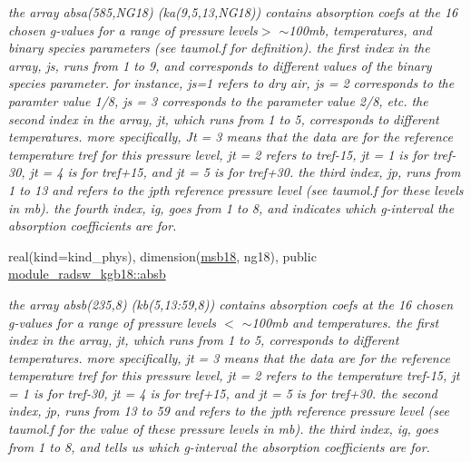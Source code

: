 \begin{DoxyCompactItemize}
\begin{DoxyCompactList}\small\item\em the array absa(585,\+N\+G18) (ka(9,5,13,\+N\+G18)) contains absorption coefs at the 16 chosen g-\/values for a range of pressure levels$>$ $\sim$100mb, temperatures, and binary species parameters (see taumol.\+f for definition). the first index in the array, js, runs from 1 to 9, and corresponds to different values of the binary species parameter. for instance, js=1 refers to dry air, js = 2 corresponds to the paramter value 1/8, js = 3 corresponds to the parameter value 2/8, etc. the second index in the array, jt, which runs from 1 to 5, corresponds to different temperatures. more specifically, Jt = 3 means that the data are for the reference temperature tref for this pressure level, jt = 2 refers to tref-\/15, jt = 1 is for tref-\/30, jt = 4 is for tref+15, and jt = 5 is for tref+30. the third index, jp, runs from 1 to 13 and refers to the jpth reference pressure level (see taumol.\+f for these levels in mb). the fourth index, ig, goes from 1 to 8, and indicates which g-\/interval the absorption coefficients are for. \end{DoxyCompactList}\item 
\mbox{\label{group__module__radsw__kgbnn_ga858680db0ee5e9a599639844a91f8f06}} 
real(kind=kind\+\_\+phys), dimension(\hyperlink{group__module__radsw__kgbnn_gad2e52d9beb90328236a351926d1a3432}{msb18}, ng18), public \hyperlink{group__module__radsw__kgbnn_ga858680db0ee5e9a599639844a91f8f06}{module\+\_\+radsw\+\_\+kgb18\+::absb}
\begin{DoxyCompactList}\small\item\em the array absb(235,8) (kb(5,13\+:59,8)) contains absorption coefs at the 16 chosen g-\/values for a range of pressure levels $<$ $\sim$100mb and temperatures. the first index in the array, jt, which runs from 1 to 5, corresponds to different temperatures. more specifically, jt = 3 means that the data are for the reference temperature tref for this pressure level, jt = 2 refers to the temperature tref-\/15, jt = 1 is for tref-\/30, jt = 4 is for tref+15, and jt = 5 is for tref+30. the second index, jp, runs from 13 to 59 and refers to the jpth reference pressure level (see taumol.\+f for the value of these pressure levels in mb). the third index, ig, goes from 1 to 8, and tells us which g-\/interval the absorption coefficients are for. \end{DoxyCompactList}\item 

\end{DoxyCompactItemize}
